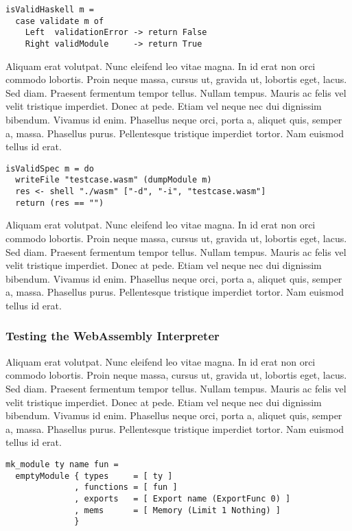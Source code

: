 \documentclass[acmsmall, anonymous]{acmart}
\begin{document}
\begin{verbatim}
isValidHaskell m =
  case validate m of
    Left  validationError -> return False
    Right validModule     -> return True
\end{verbatim}

Aliquam erat volutpat. Nunc eleifend leo vitae magna. In id erat non orci
commodo lobortis. Proin neque massa, cursus ut, gravida ut, lobortis eget,
lacus. Sed diam. Praesent fermentum tempor tellus. Nullam tempus. Mauris ac
felis vel velit tristique imperdiet. Donec at pede. Etiam vel neque nec dui
dignissim bibendum. Vivamus id enim. Phasellus neque orci, porta a, aliquet
quis, semper a, massa. Phasellus purus. Pellentesque tristique imperdiet tortor.
Nam euismod tellus id erat.

\begin{verbatim}
isValidSpec m = do
  writeFile "testcase.wasm" (dumpModule m)
  res <- shell "./wasm" ["-d", "-i", "testcase.wasm"]
  return (res == "")
\end{verbatim}

Aliquam erat volutpat. Nunc eleifend leo vitae magna. In id erat non orci
commodo lobortis. Proin neque massa, cursus ut, gravida ut, lobortis eget,
lacus. Sed diam. Praesent fermentum tempor tellus. Nullam tempus. Mauris ac
felis vel velit tristique imperdiet. Donec at pede. Etiam vel neque nec dui
dignissim bibendum. Vivamus id enim. Phasellus neque orci, porta a, aliquet
quis, semper a, massa. Phasellus purus. Pellentesque tristique imperdiet tortor.
Nam euismod tellus id erat.


\subsubsection{Testing the WebAssembly Interpreter}

Aliquam erat volutpat. Nunc eleifend leo vitae magna. In id erat non orci
commodo lobortis. Proin neque massa, cursus ut, gravida ut, lobortis eget,
lacus. Sed diam. Praesent fermentum tempor tellus. Nullam tempus. Mauris ac
felis vel velit tristique imperdiet. Donec at pede. Etiam vel neque nec dui
dignissim bibendum. Vivamus id enim. Phasellus neque orci, porta a, aliquet
quis, semper a, massa. Phasellus purus. Pellentesque tristique imperdiet tortor.
Nam euismod tellus id erat.


\begin{verbatim}
mk_module ty name fun =
  emptyModule { types     = [ ty ]
              , functions = [ fun ]
              , exports   = [ Export name (ExportFunc 0) ]
              , mems      = [ Memory (Limit 1 Nothing) ]
              }
\end{verbatim}
\end{document}
